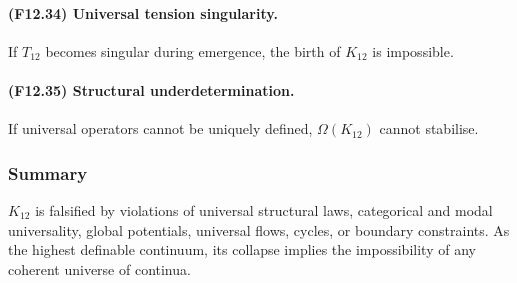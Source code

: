 \paragraph{(F12.34) Universal tension singularity.}
If $T_{12}$ becomes singular during emergence,
the birth of $K_{12}$ is impossible.

\paragraph{(F12.35) Structural underdetermination.}
If universal operators cannot be uniquely defined,
$\Omega(K_{12})$ cannot stabilise.



\subsubsection{Summary}

$K_{12}$ is falsified by violations of universal structural laws,
categorical and modal universality, global potentials, universal flows,
cycles, or boundary constraints. As the highest definable continuum,
its collapse implies the impossibility of any coherent universe of
continua.
